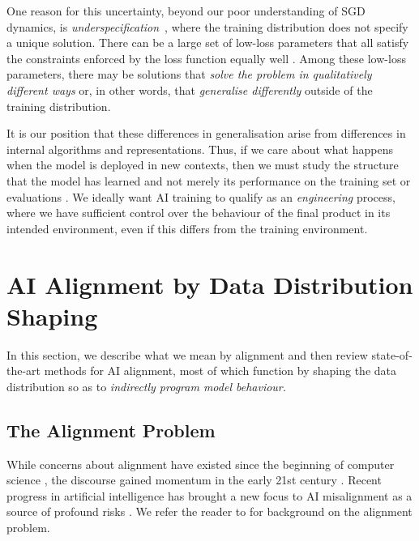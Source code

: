 One reason for this uncertainty, beyond our poor understanding of SGD dynamics, is \textit{underspecification}~\citep{d2022underspecification}, where the training distribution does not specify a unique solution.
There can be a large set of low-loss parameters that all satisfy the constraints enforced by the loss function equally well \citep{pmlr-v162-yang22k,pmlr-v235-reizinger24a,papyan2019measurements,hochreiter1997flat,fort2019emergent,chen2024stochasticcollapsegradientnoise}. Among these low-loss parameters, there may be solutions that \emph{solve the problem in qualitatively different ways} or, in other words, that \emph{generalise differently} outside of the training distribution. 

It is our position that these differences in generalisation arise from differences in internal algorithms and representations. Thus, if we care about what happens when the model is deployed in new contexts, then we must study the structure that the model has learned and not merely its performance on the training set or evaluations \citep[\S 3.4]{watanabe2024reviewprospectalgebraicresearch}. We ideally want AI training to qualify as an \emph{engineering} process, where we have sufficient control over the behaviour of the final product in its intended environment, even if this differs from the training environment.


\section{AI Alignment by Data Distribution Shaping}\label{section:alignment}

In this section, we describe what we mean by alignment and then review state-of-the-art methods for AI alignment, most of which function by shaping the data distribution so as to \emph{indirectly program model behaviour.}

\subsection{The Alignment Problem}

While concerns about alignment have existed since the beginning of computer science \citep{turing1948, good1965}, the discourse gained momentum in the early 21st century \citep{yudkowsky2004coherent,bostrom2014superintelligence}. Recent progress in artificial intelligence has brought a new focus to AI misalignment as a source of profound risks \citep{russell2019human,bengio2023managing,anwar2024foundationalchallengesassuringalignment}.
% 
We refer the reader to \citet{everitt2018agisafetyliteraturereview,christiano2019,ngo2020agi} for background on the alignment problem.

